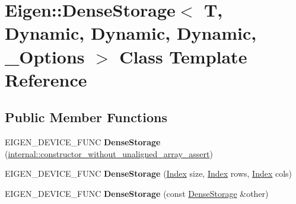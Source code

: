 \hypertarget{class_eigen_1_1_dense_storage_3_01_t_00_01_dynamic_00_01_dynamic_00_01_dynamic_00_01___options_01_4}{}\section{Eigen\+:\+:Dense\+Storage$<$ T, Dynamic, Dynamic, Dynamic, \+\_\+\+Options $>$ Class Template Reference}
\label{class_eigen_1_1_dense_storage_3_01_t_00_01_dynamic_00_01_dynamic_00_01_dynamic_00_01___options_01_4}
\subsection*{Public Member Functions}
\begin{DoxyCompactItemize}
\item 
\mbox{\label{class_eigen_1_1_dense_storage_3_01_t_00_01_dynamic_00_01_dynamic_00_01_dynamic_00_01___options_01_4_a65d66d01952f95ac059f20b8974378c6}} 
E\+I\+G\+E\+N\+\_\+\+D\+E\+V\+I\+C\+E\+\_\+\+F\+U\+NC {\bfseries Dense\+Storage} (\hyperlink{struct_eigen_1_1internal_1_1constructor__without__unaligned__array__assert}{internal\+::constructor\+\_\+without\+\_\+unaligned\+\_\+array\+\_\+assert})
\item 
\mbox{\label{class_eigen_1_1_dense_storage_3_01_t_00_01_dynamic_00_01_dynamic_00_01_dynamic_00_01___options_01_4_acd19e89326bfd06b23955737a831993e}} 
E\+I\+G\+E\+N\+\_\+\+D\+E\+V\+I\+C\+E\+\_\+\+F\+U\+NC {\bfseries Dense\+Storage} (\hyperlink{namespace_eigen_a62e77e0933482dafde8fe197d9a2cfde}{Index} size, \hyperlink{namespace_eigen_a62e77e0933482dafde8fe197d9a2cfde}{Index} rows, \hyperlink{namespace_eigen_a62e77e0933482dafde8fe197d9a2cfde}{Index} cols)
\item 
\mbox{\label{class_eigen_1_1_dense_storage_3_01_t_00_01_dynamic_00_01_dynamic_00_01_dynamic_00_01___options_01_4_a5a73c9106cf39870aa08350c6acbce67}} 
E\+I\+G\+E\+N\+\_\+\+D\+E\+V\+I\+C\+E\+\_\+\+F\+U\+NC {\bfseries Dense\+Storage} (const \hyperlink{class_eigen_1_1_dense_storage}{Dense\+Storage} \&other)

\end{DoxyCompactItemize}

